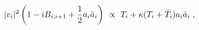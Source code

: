 \begin{equation}
 \vert v_i \vert^2 \left(1-iB_{i,i+1}  + {1\over 2} a_i \bar a_i \right) ~ \propto ~
T_i +\kappa (T_i +\bar T_i) a_i \bar a_i \;,
\end{equation}

